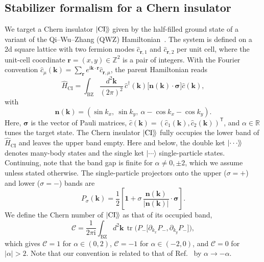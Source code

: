 \documentclass[aps,prb,10pt,twocolumn,superscriptaddress,longbibliography,floatfix]{revtex4-2}
\newcommand{\ii}{\mathrm{i}}
\newcommand{\mc}[1]{\mathcal{#1}}
\newcommand{\mr}[1]{\mathrm{#1}}
\newcommand{\Id}{\mathbf{1}}
\newcommand{\bfr}{\boldsymbol r}
\newcommand{\bk}{\boldsymbol k}
\newcommand{\kett}[1]{\ket{#1}\!\rangle}
\newcommand{\CI}{\kett{\mr{CI}}}
\begin{document}
\subsection{Stabilizer formalism for a Chern insulator}
\label{sec:Stabilizers}

We target a Chern insulator $\CI$ given by the half-filled ground state of a variant of the Qi--Wu--Zhang (QWZ) Hamiltonian~\cite{QiWuZhang2006}. The system is defined on a 2d square lattice with two fermion modes $\hat c_{\bfr,1}$ and $\hat c_{\bfr,2}$ per unit cell, where the unit-cell coordinate $\bfr=(x,y)\in\mathbb Z^2$ is a pair of integers. With the Fourier convention $\hat c_\mu(\bk)=\sum_{\bfr}e^{\ii\bk\cdot\bfr}\hat c_{\bfr,\mu}$, the parent Hamiltonian reads
\begin{equation}
    \hat H_{\mr{CI}}=\int_{\mr{BZ}}\frac{d^2\bk}{(2\pi)^2}\,
    \hat c^\dagger(\bk)\big[\boldsymbol n(\bk)\cdot\boldsymbol\sigma\big]\hat c(\bk),
    \label{eq:QWZ}
\end{equation}
with
\begin{equation}
    \boldsymbol n(\bk)=(\sin k_x,\ \sin k_y,\ \alpha-\cos k_x-\cos k_y).
    \label{eq:SpectralVector}
\end{equation}
Here, $\boldsymbol\sigma$ is the vector of Pauli matrices, $\hat c(\bk)=(\hat c_1(\bk),\hat c_2(\bk))^{\mathsf T}$, and $\alpha\in\mathbb R$ tunes the target state. The Chern insulator $\CI$ fully occupies the lower band of $\hat H_{\mr{CI}}$ and leaves the upper band empty.  Here and below, the double ket $\kett{\cdots}$ denotes many-body states and the single ket $|\cdots\rangle$ single-particle states. Continuing, note that the band gap is finite for $\alpha\neq0,\pm2$, which we assume unless stated otherwise. The single-particle projectors onto the upper ($\sigma=+$) and lower ($\sigma=-$) bands are
\begin{equation}
    P_\sigma(\bk)=\frac12\left[\Id+\sigma\,\frac{\boldsymbol n(\bk)}{|\boldsymbol n(\bk)|}\cdot\boldsymbol\sigma\right].
    \label{eq:BandProjectors}
\end{equation}
We define the Chern number of $\CI$ as that of its occupied band,
\begin{equation}
    \mc C=\frac{1}{2\pi\ii}\int_{\mr{BZ}}d^2\bk\,
    \operatorname{tr}\!\Big(P_-\big[\partial_{k_x}P_-,\partial_{k_y}P_-\big]\Big),
    \label{eq:ChernNumber}
\end{equation}
which gives $\mc C=1$ for $\alpha\in(0,2)$, $\mc C=-1$ for $\alpha\in(-2,0)$, and $\mc C=0$ for $|\alpha|>2$. Note that our convention is related to that of Ref.~\cite{BhuiyanPanJian2026} by $\alpha\to-\alpha$.
\end{document}

